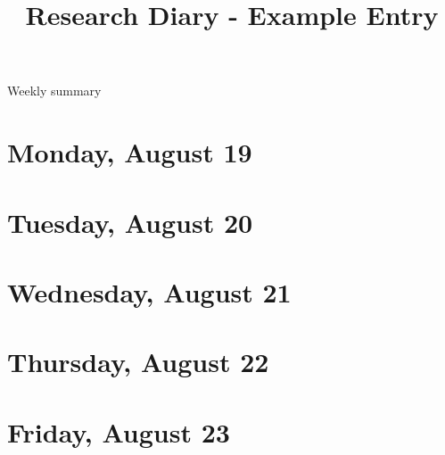 \documentclass[11pt,letterpaper]{article}
\begin{document}
\univlogo

\title{Research Diary - Example Entry}

{\Huge Weekly summary}\\[5mm]

\section*{Monday, August 19}

\section*{Tuesday, August 20}

\section*{Wednesday, August 21}

\section*{Thursday, August 22}

\section*{Friday, August 23}

\printbibliography 
\end{document}
